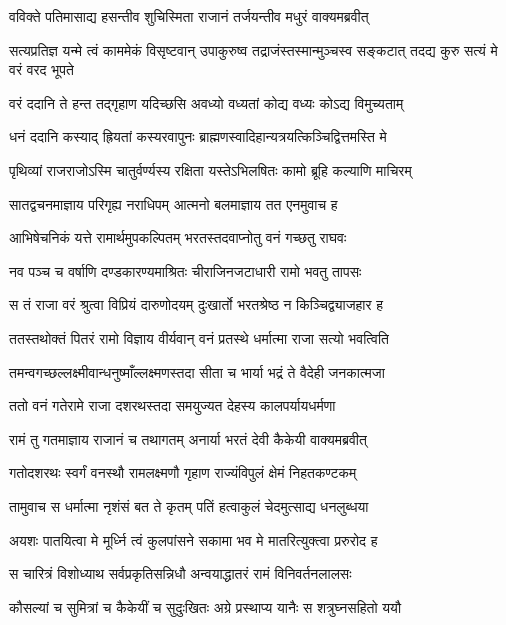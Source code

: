 \twolineshloka
{वविक्ते पतिमासाद्य हसन्तीव शुचिस्मिता}
{राजानं तर्जयन्तीव मधुरं वाक्यमब्रवीत्}


\threelineshloka
{सत्यप्रतिज्ञ यन्मे त्वं काममेकं विसृष्टवान्}
{उपाकुरुष्व तद्राजंस्तस्मान्मुञ्चस्व सङ्कटात्}
{तदद्य कुरु सत्यं मे वरं वरद भूपते}



\twolineshloka
{वरं ददानि ते हन्त तद्गृहाण यदिच्छसि}
{अवध्यो वध्यतां कोद्य वध्यः कोऽद्य विमुच्यताम्}


\twolineshloka
{धनं ददानि कस्याद् ह्रियतां कस्यरवापुनः}
{ब्राह्मणस्वादिहान्यत्रयत्किञ्चिद्वित्तमस्ति मे}


\twolineshloka
{पृथिव्यां राजराजोऽस्मि चातुर्वर्ण्यस्य रक्षिता}
{यस्तेऽभिलषितः कामो ब्रूहि कल्याणि माचिरम्}


\twolineshloka
{सातद्वचनमाज्ञाय परिगृह्य नराधिपम्}
{आत्मनो बलमाज्ञाय तत एनमुवाच ह}


\twolineshloka
{आभिषेचनिकं यत्ते रामार्थमुपकल्पितम्}
{भरतस्तदवाप्नोतु वनं गच्छतु राघवः}


\twolineshloka
{नव पञ्च च वर्षाणि दण्डकारण्यमाश्रितः}
{चीराजिनजटाधारी रामो भवतु तापसः}


\twolineshloka
{स तं राजा वरं श्रुत्वा विप्रियं दारुणोदयम्}
{दुःखार्तो भरतश्रेष्ठ न किञ्चिद्व्याजहार ह}


\twolineshloka
{ततस्तथोक्तं पितरं रामो विज्ञाय वीर्यवान्}
{वनं प्रतस्थे धर्मात्मा राजा सत्यो भवत्विति}


\twolineshloka
{तमन्वगच्छल्लक्ष्मीवान्धनुष्माँल्लक्ष्मणस्तदा}
{सीता च भार्या भद्रं ते वैदेही जनकात्मजा}


\twolineshloka
{ततो वनं गतेरामे राजा दशरथस्तदा}
{समयुज्यत देहस्य कालपर्यायधर्मणा}


\twolineshloka
{रामं तु गतमाज्ञाय राजानं च तथागतम्}
{अनार्या भरतं देवी कैकेयी वाक्यमब्रवीत्}


\twolineshloka
{गतोदशरथः स्वर्गं वनस्थौ रामलक्ष्मणौ}
{गृहाण राज्यंविपुलं क्षेमं निहतकण्टकम्}


\twolineshloka
{तामुवाच स धर्मात्मा नृशंसं बत ते कृतम्}
{पतिं हत्वाकुलं चेदमुत्साद्य धनलुब्धया}


\twolineshloka
{अयशः पातयित्वा मे मूर्ध्नि त्वं कुलपांसने}
{सकामा भव मे मातरित्युक्त्वा प्ररुरोद ह}


\twolineshloka
{स चारित्रं विशोध्याथ सर्वप्रकृतिसन्निधौ}
{अन्वयाद्धातरं रामं विनिवर्तनलालसः}


\twolineshloka
{कौसल्यां च सुमित्रां च कैकेयीं च सुदुःखितः}
{अग्रे प्रस्थाप्य यानैः स शत्रुघ्नसहितो ययौ}


